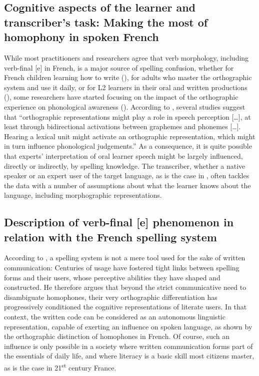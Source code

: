 \documentclass[output=paper,colorlinks,citecolor=brown,modfonts,nonflat]{../langscibook}
\begin{document}
\subsection{ \textbf{Cognitive aspects of the learner and transcriber’s task: Making the most of homophony in spoken French}}%

While most practitioners and researchers agree that verb morphology, including verb-final [e] in French, is a major source of spelling confusion, whether for French children learning how to write (\citealt{BrissaudSandon1999,DavidEtAl2006,FayolPacton2006}), for adults who master the orthographic system and use it daily, or for L2 learners in their oral and written productions (\citealt{DavidEtAl2006,BrissaudEtAl2006,Prévost2007French,Granget2015}), some researchers have started focusing on the impact of the orthographic experience on phonological awareness (\citealt{BassettiEtAl2015,NimzKhattab2019}). According to \citet[68]{DeteyNespoulous2008}, several studies suggest that “orthographic representations might play a role in speech perception […], at least through bidirectional activations between graphemes and phonemes […]. Hearing a lexical unit might activate an orthographic representation, which might in turn influence phonological judgements.” As a consequence, it is quite possible that experts’ interpretation of oral learner speech might be largely influenced, directly or indirectly, by spelling knowledge. The transcriber, whether a native speaker or an expert user of the target language, as is the case in , often tackles the data with a number of assumptions about what the learner knows about the language, including morphographic representations.

\subsection{ \textbf{Description of verb-final [e] phenomenon in relation with the French spelling system}}%

According to \citet[25]{Jaffré2006}, a spelling system is not a mere tool used for the sake of written communication: Centuries of usage have fostered tight links between spelling forms and their users, whose perceptive abilities they have shaped and constructed. He therefore argues that beyond the strict communicative need to disambiguate homophones, their very orthographic differentiation has progressively conditioned the cognitive representations of literate users. In that context, the written code can be considered as an autonomous linguistic representation, capable of exerting an influence on spoken language, as shown by the orthographic distinction of homophones in French. Of course, such an influence is only possible in a society where written communication forms part of the essentials of daily life, and where literacy is a basic skill most citizens master, as is the case in 21\textsuperscript{st} century France.
\end{document}
